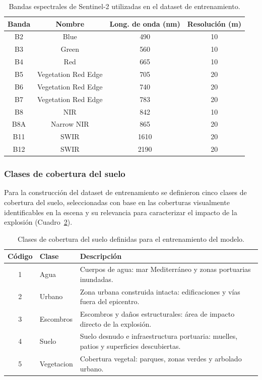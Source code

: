 \documentclass[12pt, a4paper]{article}
\begin{document}
\begin{table}[H]
\centering
\caption{Bandas espectrales de Sentinel-2 utilizadas en el dataset de entrenamiento.}
\label{tab:bandas}
\begin{tabular}{cccc}
\toprule
\textbf{Banda} & \textbf{Nombre} & \textbf{Long. de onda (nm)} & \textbf{Resolución (m)} \\
\midrule
B2  & Blue                & 490   & 10 \\
B3  & Green               & 560   & 10 \\
B4  & Red                 & 665   & 10 \\
B5  & Vegetation Red Edge & 705   & 20 \\
B6  & Vegetation Red Edge & 740   & 20 \\
B7  & Vegetation Red Edge & 783   & 20 \\
B8  & NIR                 & 842   & 10 \\
B8A & Narrow NIR          & 865   & 20 \\
B11 & SWIR                & 1610  & 20 \\
B12 & SWIR                & 2190  & 20 \\
\bottomrule
\end{tabular}
\end{table}

\subsubsection*{Clases de cobertura del suelo}

Para la construcción del dataset de entrenamiento se definieron cinco clases de cobertura
del suelo, seleccionadas con base en las coberturas visualmente identificables en la escena
y su relevancia para caracterizar el impacto de la explosión (Cuadro~\ref{tab:clases}).

\begin{table}[H]
\centering
\caption{Clases de cobertura del suelo definidas para el entrenamiento del modelo.}
\label{tab:clases}
\begin{tabular}{clp{8cm}}
\toprule
\textbf{Código} & \textbf{Clase} & \textbf{Descripción} \\
\midrule
1 & Agua       & Cuerpos de agua: mar Mediterráneo y zonas portuarias inundadas. \\
2 & Urbano     & Zona urbana construida intacta: edificaciones y vías fuera del epicentro. \\
3 & Escombros  & Escombros y daños estructurales: área de impacto directo de la explosión. \\
4 & Suelo      & Suelo desnudo e infraestructura portuaria: muelles, patios y superficies descubiertas. \\
5 & Vegetacion & Cobertura vegetal: parques, zonas verdes y arbolado urbano. \\
\bottomrule
\end{tabular}
\end{table}
\end{document}

